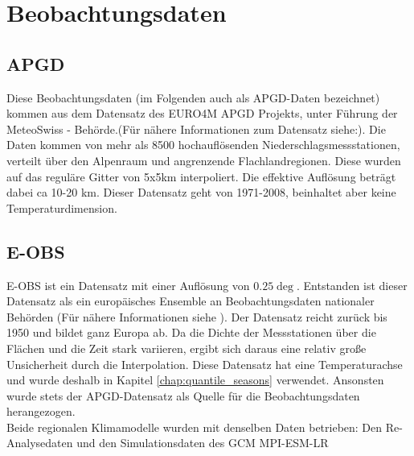 \section{Beobachtungsdaten}
\subsection{APGD}
Diese Beobachtungsdaten (im Folgenden auch als APGD-Daten bezeichnet) kommen aus dem Datensatz  des EURO4M APGD Projekts, unter Führung der MeteoSwiss - Behörde\cite{meteoswiss}.(Für nähere Informationen zum Datensatz siehe:\cite{apgd}). Die Daten kommen von mehr als 8500 hochauflösenden Niederschlagsmessstationen, verteilt über den Alpenraum und angrenzende Flachlandregionen. Diese wurden auf das reguläre Gitter von 5x5km interpoliert. Die effektive Auflösung beträgt dabei ca 10-20 km. Dieser Datensatz geht von 1971-2008, beinhaltet aber keine Temperaturdimension.
\subsection{E-OBS}
E-OBS ist ein Datensatz mit einer Auflösung von $0.25\deg$. Entstanden ist dieser Datensatz als ein europäisches Ensemble an Beobachtungsdaten nationaler Behörden (Für nähere Informationen siehe \cite{eobs}). Der Datensatz reicht zurück bis 1950 und bildet ganz Europa ab. Da die Dichte der Messstationen über die Flächen und die Zeit stark variieren, ergibt sich daraus eine relativ große Unsicherheit durch die Interpolation. Diese Datensatz hat eine Temperaturachse und wurde deshalb in Kapitel \ref{chap:quantile_seasons} verwendet. Ansonsten wurde stets der APGD-Datensatz als Quelle für die Beobachtungsdaten herangezogen.\\
Beide regionalen Klimamodelle wurden mit denselben Daten betrieben: Den Re-Analysedaten und den Simulationsdaten des GCM MPI-ESM-LR 
